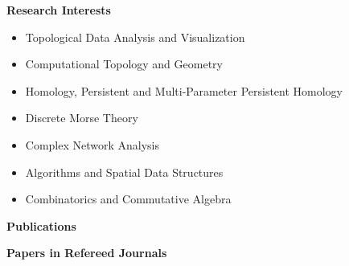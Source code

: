 \documentclass[11pt]{article}
\begin{document}
\noindent
{\Large\bf Research Interests}

\begin{itemize}

\item Topological Data Analysis and Visualization
\item Computational Topology and Geometry
\item Homology, Persistent and Multi-Parameter Persistent Homology
\item Discrete Morse Theory
\item Complex Network Analysis
\item Algorithms and Spatial Data Structures
\item Combinatorics and Commutative Algebra

\end {itemize}






\vspace*{3ex}
\noindent
{\Large\bf Publications}

\vspace*{1.5ex}

\noindent
{\bf Papers in Refereed Journals}
\end{document}
